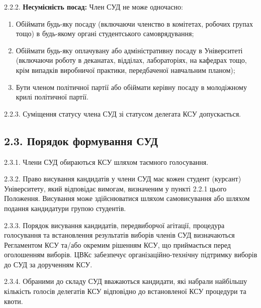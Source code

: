     2.2.2. \textbf{Несумісність посад:} Член СУД не може одночасно:
        \begin{enumerate}[label=\alph*)]
            \item Обіймати будь-яку посаду (включаючи членство в комітетах, робочих групах тощо) в будь-якому органі студентського самоврядування;
            \item Обіймати будь-яку оплачувану або адміністративну посаду в Університеті (включаючи роботу в деканатах, відділах, лабораторіях, на кафедрах тощо, крім випадків виробничої практики, передбаченої навчальним планом);
            \item Бути членом політичної партії або обіймати керівну посаду в молодіжному крилі політичної партії.
        \end{enumerate}
    2.2.3. Суміщення статусу члена СУД зі статусом делегата КСУ допускається.

\subsection*{2.3. Порядок формування СУД}
    2.3.1. Члени СУД обираються КСУ шляхом таємного голосування.

    2.3.2. Право висування кандидатів у члени СУД має кожен студент (курсант) Університету, який відповідає вимогам, визначеним у пункті 2.2.1 цього Положення. Висування може здійснюватися шляхом самовисування або шляхом подання кандидатури групою студентів.

    2.3.3. Порядок висування кандидатів, передвиборчої агітації, процедура голосування та встановлення результатів виборів членів СУД визначаються Регламентом КСУ та/або окремим рішенням КСУ, що приймається перед оголошенням виборів. ЦВКс забезпечує організаційно-технічну підтримку виборів до СУД за дорученням КСУ.

    2.3.4. Обраними до складу СУД вважаються кандидати, які набрали найбільшу кількість голосів делегатів КСУ відповідно до встановленої КСУ процедури та квоти.

